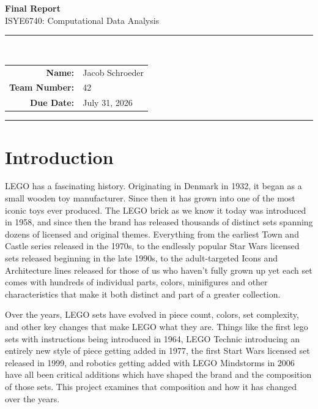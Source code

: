 \documentclass[11pt, letterpaper]{article}
\newcommand{\StudentName}{Jacob Schroeder}
\newcommand{\TeamNumber}{42}
\newcommand{\CourseName}{ISYE6740: Computational Data Analysis}
\newcommand{\AssignmentName}{Final Report}
\newcommand{\AssignmentDue}{July 31, 2026}
\begin{document}
\thispagestyle{empty}
\begin{center}
    \vspace*{1.5cm}

    {\Huge \textbf{\AssignmentName}}\\[0.6cm]
    {\large \CourseName}\\[0.4cm]
    \rule{0.6\textwidth}{0.8pt}\\[0.8cm]

    \begin{tabular}{>{\bfseries}r l}
        Name:        & \StudentName   \\[4pt]
        Team Number:  & \TeamNumber     \\[4pt]
        Due Date:    & \AssignmentDue \\[4pt]
    \end{tabular}

    \vspace{1.2cm}
    \rule{0.6\textwidth}{0.8pt}
\end{center}

\newpage
\thispagestyle{fancy}
\tableofcontents


\newpage
\section{Introduction}

LEGO has a fascinating history. Originating in Denmark in 1932, it began as a small wooden toy manufacturer. Since then it has grown into one of the most iconic toys ever produced. The LEGO brick as we know it today was introduced in 1958, and since then the brand has released thousands of distinct sets spanning dozens of licensed and original themes. Everything from the earliest Town and Castle series released in the 1970s, to the endlessly popular Star Wars licensed sets released beginning in the late 1990s, to the adult-targeted Icons and Architecture lines released for those of us who haven't fully grown up yet each set comes with hundreds of individual parts, colors, minifigures and other characteristics that make it both distinct and part of a greater collection.

Over the years, LEGO sets have evolved in piece count, colors, set complexity, and other key changes that make LEGO what they are. Things like the first lego sets with instructions being introduced in 1964, LEGO Technic introducing an entirely new style of piece getting added in 1977, the first Start Wars licensed set released in 1999, and robotics getting added with LEGO Mindstorms in 2006 have all been critical additions which have shaped the brand and the composition of those sets. This project examines that composition and how it has changed over the years.
\end{document}
